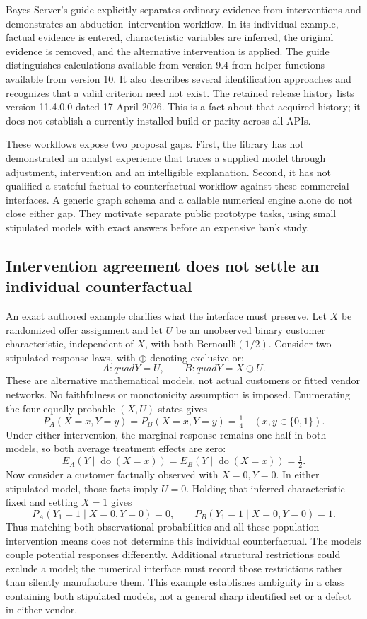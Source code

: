 Bayes Server's guide explicitly separates ordinary evidence from
interventions and demonstrates an abduction--intervention workflow. In its
individual example, factual evidence is entered, characteristic variables
are inferred, the original evidence is removed, and the alternative
intervention is applied. The guide distinguishes calculations available
from version 9.4 from helper functions available from version 10. It also
describes several identification approaches and recognizes that a valid
criterion need not exist. The retained release history lists version
11.4.0.0 dated 17 April 2026. This is a fact about that acquired history; it
does not establish a currently installed build or parity across all APIs.
\citep{exec13_ci_bayesserver_causality,exec14_ci_release_history}

These workflows expose two proposal gaps. First, the library has not
demonstrated an analyst experience that traces a supplied model through
adjustment, intervention and an intelligible explanation. Second, it has
not qualified a stateful factual-to-counterfactual workflow against these
commercial interfaces. A generic graph schema and a callable numerical
engine alone do not close either gap. They motivate separate public
prototype tasks, using small stipulated models with exact answers before
an expensive bank study.~\citep{exec25_bn_commercial_choice}

\subsection{Intervention agreement does not settle an individual counterfactual}

An exact authored example clarifies what the interface must preserve. Let
$X$ be randomized offer assignment and let $U$ be an unobserved binary
customer characteristic, independent of $X$, with both Bernoulli$(1/2)$.
Consider two stipulated response laws, with $\oplus$ denoting exclusive-or:
\[
 A:quad Y=U,\qquad B:quad Y=X\oplus U.
\]
These are alternative mathematical models, not actual customers or fitted
vendor networks. No faithfulness or monotonicity assumption is imposed.
Enumerating the four equally probable $(X,U)$ states gives
\[
 P_A(X=x,Y=y)=P_B(X=x,Y=y)=\tfrac14
 \quad(x,y\in\{0,1\}).
\]
Under either intervention, the marginal response remains one half in both
models, so both average treatment effects are zero:
\[
 E_A(Y\mid\operatorname{do}(X=x))
 =E_B(Y\mid\operatorname{do}(X=x))=\tfrac12.
\]
Now consider a customer factually observed with $X=0,Y=0$. In either
stipulated model, those facts imply $U=0$. Holding that inferred
characteristic fixed and setting $X=1$ gives
\[
 P_A(Y_1=1\mid X=0,Y=0)=0,\qquad
 P_B(Y_1=1\mid X=0,Y=0)=1.
\]
Thus matching both observational probabilities and all these population
intervention means does not determine this individual counterfactual. The
models couple potential responses differently. Additional structural
restrictions could exclude a model; the numerical interface must record
those restrictions rather than silently manufacture them. This example
establishes ambiguity in a class containing both stipulated models, not a
general sharp identified set or a defect in either vendor.
\citep{exec25_bn_commercial_choice}

